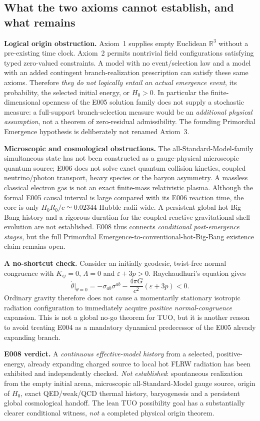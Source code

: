 \documentclass[11pt,a4paper]{article}
\newcommand{\R}{\mathbb{R}}
\theoremstyle{tmon}
\theoremstyle{definition}
\begin{document}
\subsection{What the two axioms cannot establish, and what remains}
\textbf{Logical origin obstruction.} Axiom~1 supplies empty Euclidean $\R^3$ without a pre-existing time clock. Axiom~2 permits nontrivial field configurations satisfying typed zero-valued constraints. A model with no event/selection law and a model with an added contingent branch-realization prescription can satisfy these same axioms. Therefore \emph{they do not logically entail an actual emergence event}, its probability, the selected initial energy, or $H_0>0$. In particular the finite-dimensional openness of the E005 solution family does not supply a stochastic measure: a full-support branch-selection measure would be an \emph{additional physical assumption}, not a theorem of zero-residual admissibility. The founding Primordial Emergence hypothesis is deliberately not renamed Axiom~3.

\textbf{Microscopic and cosmological obstructions.} The all-Standard-Model-family simultaneous state has not been constructed as a gauge-physical microscopic quantum source; E006 does not solve exact quantum collision kinetics, coupled neutrino/photon transport, heavy species or the baryon asymmetry. A massless classical electron gas is not an exact finite-mass relativistic plasma. Although the formal E005 causal interval is large compared with its E006 reaction time, the core is only $H_0R_0/c\simeq0.02344$ Hubble radii wide. A persistent global hot-Big-Bang history and a rigorous duration for the coupled reactive gravitational shell evolution are not established. E008 thus connects \emph{conditional post-emergence stages}, but the full Primordial Emergence-to-conventional-hot-Big-Bang existence claim remains open.

\textbf{A no-shortcut check.} Consider an initially geodesic, twist-free normal congruence with $K_{ij}=0$, $\Lambda=0$ and $\varepsilon+3p>0$. Raychaudhuri's equation gives
\[
\dot\theta|_{\theta=0}=-\sigma_{ab}\sigma^{ab}-\frac{4\pi G}{c^2}(\varepsilon+3p)<0.
\]
Ordinary gravity therefore does not cause a momentarily stationary isotropic radiation configuration to immediately acquire \emph{positive normal-congruence} expansion. This is not a global no-go theorem for TUO, but it is another reason to avoid treating E004 as a mandatory dynamical predecessor of the E005 already expanding branch.

\begin{warningbox}
\textbf{E008 verdict.} A \emph{continuous effective-model history} from a selected, positive-energy, already expanding charged source to local hot FLRW radiation has been exhibited and independently checked. \emph{Not established}: spontaneous realization from the empty initial arena, microscopic all-Standard-Model gauge source, origin of $H_0$, exact QED/weak/QCD thermal history, baryogenesis and a persistent global cosmological handoff. The lean TUO possibility goal has a substantially clearer conditional witness, \emph{not} a completed physical origin theorem.
\end{warningbox}
\end{document}
